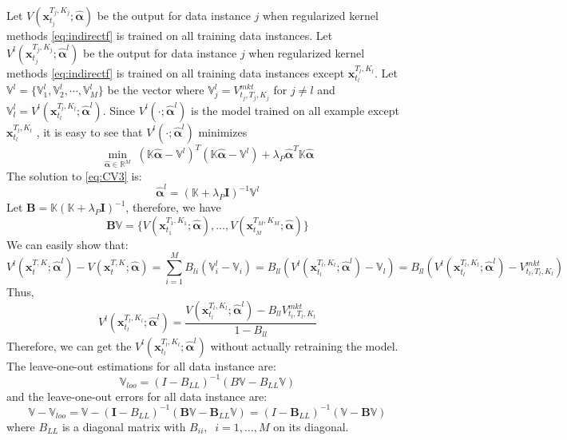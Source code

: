 \documentclass[letterpaper,12pt,titlepage,oneside,final]{book}
\numberwithin{equation}{section}
\theoremstyle{definition}
\newcommand{\vx}{\mathbf{x}}
\newcommand{\Real}{\mathbb{R}}
\newcommand{\valpha}{\pmb{\widehat{\alpha}}}
\newcommand{\vK}{\mathbb{K}}
\newcommand{\Vmkt}{V^{mkt}}
\newcommand{\vecVmkt}{\mathbb{V}}
\begin{document}
Let $V(\vx_{t_j}^{T_j,K_j}; \valpha)$ be the output for data instance $j$ when regularized kernel methods \eqref{eq:indirectf} is trained on all training data instances. Let $V^l(\vx_{t_j}^{T_j,K_j}; \valpha^l)$  be the output for data instance $j$ when regularized kernel methods \eqref{eq:indirectf} is trained on all training data instances except $\vx_{t_l}^{T_l,K_l}$. 
Let $\vecVmkt^l=\{\vecVmkt^l_1,\vecVmkt^l_2,\cdots,\vecVmkt^l_M\}$ be the vector where $\vecVmkt^l_{j} = \Vmkt_{t_j,T_j,K_j}$ for $j \neq l$ and $\vecVmkt^l_l = V^l(\vx_{t_l}^{T_l,K_l}; \valpha^l)$. Since $V^l(\cdot; \valpha^l)$ is the model trained on all example except $\vx_{t_l}^{T_l,K_l}$ , it is easy to see that $V^l(\cdot; \valpha^l)$  minimizes
\begin{equation}
\min_{\valpha \in \Real^M} \; ( \vK \valpha - \vecVmkt^l)^T ( \vK \valpha -\vecVmkt^l)+ \lambda_P \valpha^T\vK\valpha
\label{eq:CV3}
\end{equation}
The solution to \eqref{eq:CV3} is:
\[
\valpha^l  =(\vK+\lambda_P \pmb{I})^{-1}\vecVmkt^l
\]
Let $\pmb{B}=\vK (\vK+\lambda_P \pmb{I})^{-1}$, therefore, we have 
\[\pmb{B}\vecVmkt=\{
	V(\vx_{t_1}^{T_1,K_1}; \valpha),
	\dots,
	V(\vx_{t_M}^{T_M,K_M}; \valpha)
	\}
\]
We can easily show that:
\[
	V^l(\vx_{t}^{T,K}; \valpha^l)-V(\vx_{t}^{T,K}; \valpha)=\sum_{i=1}^M B_{li}(\vecVmkt_i^l-\vecVmkt_i)=B_{ll}(V^l(\vx_{t_l}^{T_l,K_l}; \valpha^l)-\vecVmkt_l)=B_{ll}(V^l(\vx_{t_l}^{T_l,K_l}; \valpha^l)-\Vmkt_{t_l,T_l,K_l})
\]
Thus,
\begin{equation} \label{eq:fastCV}
	V^l(\vx_{t_l}^{T_l,K_l}; \valpha^l)=
	\frac{V(\vx_{t_l}^{T_l,K_l}; \valpha^l)-B_{ll}\Vmkt_{t_l,T_l,K_l}}
	{1-B_{ll}}
\end{equation}
Therefore, we can get the $V^l(\vx_{t_l}^{T_l,K_l}; \valpha^l)$  without actually retraining the model. The leave-one-out estimations for all data instance are:
\begin{equation} \label{eq:fastCV2}
\vecVmkt_{loo}=(I-B_{LL})^{-1}(B\vecVmkt-B_{LL}\vecVmkt)
\end{equation}
and the leave-one-out errors for all data instance are:
\begin{equation} \label{eq:fastCV3}
\vecVmkt-\vecVmkt_{loo}=\vecVmkt-(\pmb{I}-B_{LL})^{-1}(\pmb{B}\vecVmkt-\pmb{B}_{LL}\vecVmkt)=(I-\pmb{B}_{LL})^{-1}(\vecVmkt-\pmb{B}\vecVmkt)
\end{equation}
where $B_{LL}$ is a diagonal matrix with $B_{ii},\;\; i=1,\dots,M$ on its diagonal.
\end{document}
